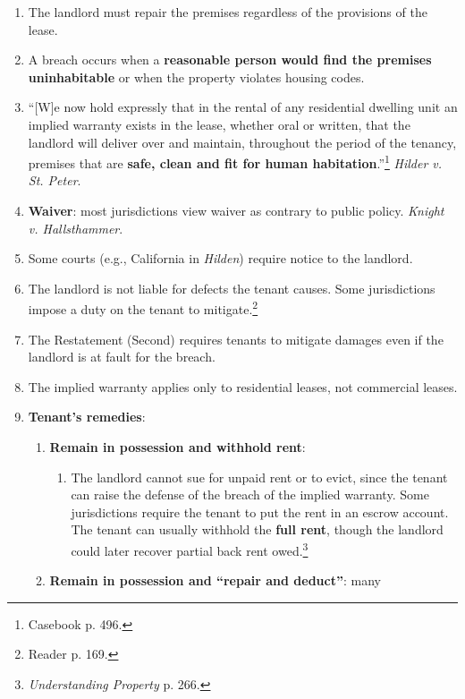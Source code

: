 \begin{enumerate}
    \item The landlord must repair the premises regardless of the provisions 
    of the lease.
    \item A breach occurs when a \textbf{reasonable person would find the 
    premises uninhabitable} or when the property violates housing codes.
    \item ``[W]e now hold expressly that in the rental of any residential 
    dwelling unit an implied warranty exists in the lease, whether oral or 
    written, that the landlord will deliver over and maintain, throughout the 
    period of the tenancy, premises that are \textbf{safe, clean and fit for 
    human habitation}.''\footnote{Casebook p. 496.} \emph{Hilder v. St. 
    Peter}.
    \item \textbf{Waiver}: most jurisdictions view waiver as contrary to 
    public policy. \emph{Knight v. Hallsthammer}.
    \item Some courts (e.g., California in \emph{Hilden}) require notice to 
    the landlord.
    \item The landlord is not liable for defects the tenant causes. Some 
    jurisdictions impose a duty on the tenant to mitigate.\footnote{Reader p. 
    169.}
    \item The Restatement (Second) requires tenants to mitigate damages even 
    if the landlord is at fault for the breach.
    \item The implied warranty applies only to residential leases, not 
    commercial leases.
    \item \textbf{Tenant's remedies}:
    \begin{enumerate}
        \item \textbf{Remain in possession and withhold rent}:
        \begin{enumerate}
            \item The landlord cannot sue for unpaid rent or to evict, since 
            the tenant can raise the defense of the breach of the implied 
            warranty.  Some jurisdictions require the tenant to put the rent 
            in an escrow account. The tenant can usually withhold the 
            \textbf{full rent}, though the landlord could later recover 
            partial back rent owed.\footnote{\emph{Understanding Property} p. 
            266.}
        \end{enumerate}
        \item \textbf{Remain in possession and ``repair and deduct''}: many 

\end{enumerate}
\end{enumerate}
